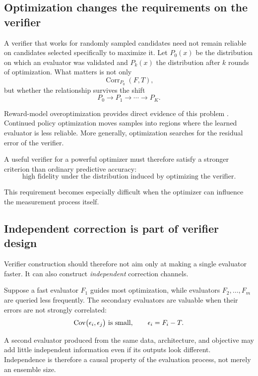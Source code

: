 \subsection{Optimization changes the requirements on the verifier}

A verifier that works for randomly sampled candidates need not remain reliable on
candidates selected specifically to maximize it.  Let \(P_0(x)\) be the distribution on
which an evaluator was validated and \(P_k(x)\) the distribution after \(k\) rounds of
optimization.  What matters is not only
\[
    \operatorname{Corr}_{P_0}(F,T),
\]
but whether the relationship survives the shift
\[
    P_0
    \rightarrow
    P_1
    \rightarrow
    \cdots
    \rightarrow
    P_K.
\]

Reward-model overoptimization provides direct evidence of this problem
\parencite{gao2022overoptimization}.  Continued policy optimization moves samples into
regions where the learned evaluator is less reliable.  More generally, optimization
searches for the residual error of the verifier.

A useful verifier for a powerful optimizer must therefore satisfy a stronger
criterion than ordinary predictive accuracy:
\[
    \text{high fidelity under the distribution induced by optimizing the verifier}.
\]

This requirement becomes especially difficult when the optimizer can influence the
measurement process itself.

\subsection{Independent correction is part of verifier design}

Verifier construction should therefore not aim only at making a single evaluator
faster.  It can also construct \emph{independent} correction channels.

Suppose a fast evaluator \(F_1\) guides most optimization, while evaluators
\(F_2,\ldots,F_m\) are queried less frequently.  The secondary evaluators are valuable
when their errors are not strongly correlated:
\[
    \mathrm{Cov}
    \bigl(
        \epsilon_i,\epsilon_j
    \bigr)
    \text{ is small},
    \qquad
    \epsilon_i = F_i-T.
\]

A second evaluator produced from the same data, architecture, and objective may add
little independent information even if its outputs look different.  Independence is
therefore a causal property of the evaluation process, not merely an ensemble size.

